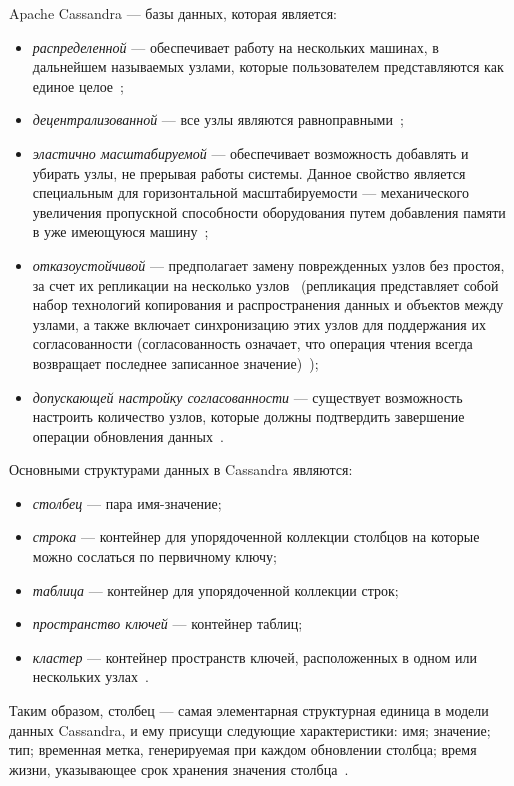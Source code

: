 Apache Cassandra --- базы данных, которая является:

\begin{itemize}
    \item \textit{распределенной} --- обеспечивает работу на нескольких машинах, в дальнейшем называемых узлами, которые пользователем представляются как единое целое~\cite{myref3};
    \item \textit{децентрализованной} --- все узлы являются равноправными~\cite{myref3};
    \item \textit{эластично масштабируемой} --- обеспечивает возможность добавлять и убирать узлы, не прерывая работы системы.
Данное свойство является специальным для горизонтальной масштабируемости --- механического увеличения пропускной способности оборудования путем добавления памяти в уже имеющуюся машину~\cite{myref3};
    \item \textit{отказоустойчивой} --- предполагает замену поврежденных узлов без простоя, за счет их репликации на несколько узлов~\cite{myref3}
(репликация представляет собой набор технологий копирования и распространения данных и объектов между узлами, а также включает синхронизацию этих узлов для поддержания их согласованности
(согласованность означает, что операция чтения всегда возвращает последнее записанное значение)~\cite{myref3, myref4});
    \item \textit{допускающей настройку согласованности} --- существует возможность настроить количество узлов, которые должны подтвердить завершение операции обновления данных~\cite{myref3}.
\end{itemize}
Основными структурами данных в Cassandra являются:
\begin{itemize}
\item \textit{столбец} --- пара имя-значение;
\item \textit{строка} --- контейнер для упорядоченной коллекции столбцов на которые можно сослаться по первичному ключу;
\item \textit{таблица} --- контейнер для упорядоченной коллекции строк;
\item \textit{пространство ключей} --- контейнер таблиц;
\item \textit{кластер} --- контейнер пространств ключей, расположенных в одном или нескольких узлах~\cite{myref3}.
\end{itemize}

Таким образом, столбец --- самая элементарная структурная единица в модели данных Cassandra, и ему присущи следующие характеристики:
имя; значение; тип; временная метка, генерируемая при каждом обновлении столбца; время жизни, указывающее срок хранения значения столбца~\cite{myref3}.

